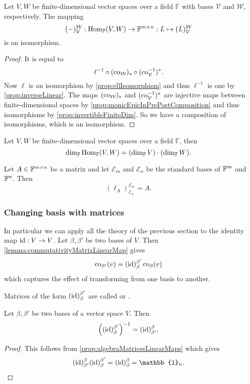 \begin{proposition}
Let $V,W$ be finite-dimensional vector spaces over a field $\mathbb{F}$ with bases $\mathcal{V}$ and $\mathcal{W}$, respectively. The mapping
\[ (-)^{\mathcal{W}}_{\mathcal{V}}:\operatorname{Hom}_\mathbb{F}(V,W) \to \mathbb{F}^{m\times n}: L\mapsto (L)^{\mathcal{W}}_{\mathcal{V}} \]
is an isomorphism.
\end{proposition}
\begin{proof}
It is equal to
\[ \ell^{-1}\circ(\operatorname{co}_\mathcal{W})_*\circ(\operatorname{co}^{-1}_\mathcal{V})^*. \]
Now $\ell$ is an isomorphism by \ref{prop:ellIsomorphism} and thus $\ell^{-1}$ is one by \ref{prop:inverseLinear}. The maps $(\operatorname{co}_\mathcal{W})_*$ and $(\operatorname{co}^{-1}_\mathcal{V})^*$ are injective maps between finite-dimensional spaces by \ref{prop:monicEpicInPrePostComposition} and thus isomorphisms by \ref{prop:invertibleFiniteDim}.
So we have a composition of isomorphisms, which is an isomorphism.
\end{proof}
\begin{corollary}
Let $V,W$ be finite-dimensional vector spaces over a field $\mathbb{F}$, then
\[ \dim_{\mathbb{F}}\operatorname{Hom}_\mathbb{F}(V,W) = (\dim_{\mathbb{F}} V)\cdot (\dim_{\mathbb{F}} W). \] \label{prop:dimHomset}
\end{corollary}

\begin{lemma}
Let $A\in\mathbb{F}^{m\times n}$ be a matrix and let $\mathcal{E}_m$ and $\mathcal{E}_n$ be the standard bases of $\mathbb{F}^m$ and $\mathbb{F}^n$. Then
\[ (\ell_{A})_{\mathcal{E}_n}^{\mathcal{E}_m} = A. \]
\end{lemma}

\subsubsection{Changing basis with matrices}
In particular we can apply all the theory of the previous section to the identity map $\operatorname{id}: V\to V$. Let $\beta, \beta'$ be two bases of $V$. Then \ref{lemma:commutativityMatrixLinearMap} gives
\[ \operatorname{co}_{\beta'}(v) = (\operatorname{id})_{\beta}^{\beta'}\operatorname{co}_\beta(v) \]
which captures the effect of transforming from one basis to another.
\begin{definition}
Matrices of the form $(\operatorname{id})_{\beta}^{\beta'}$ are called  or .
\end{definition}
\begin{lemma}
Let $\beta, \beta'$ be two bases of a vector space $V$. Then
\[ \left((\operatorname{id})_{\beta}^{\beta'}\right)^{-1} = (\operatorname{id})_{\beta'}^{\beta}. \]
\end{lemma}
\begin{proof}
This follows from \ref{prop:algebraMatricesLinearMaps} which gives
\[ (\id)_{\beta'}^{\beta}(\id)_{\beta}^{\beta'} = (\id)_\beta^\beta = \mathbb{1}_n. \]
\end{proof}


